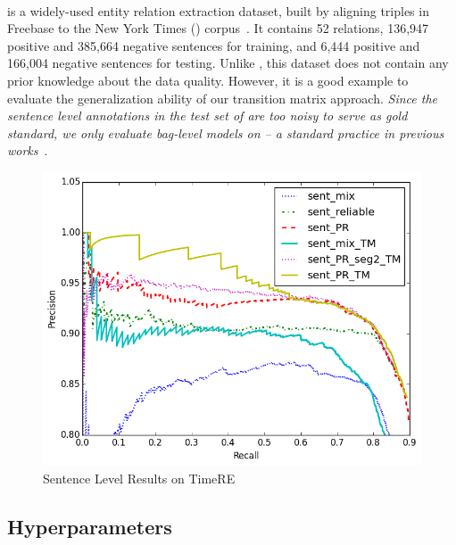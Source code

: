 \paragraph{\EntityRE} is a widely-used entity
relation extraction dataset, built %
by aligning triples
in Freebase to the New York Times (\NYT) corpus~\cite{riedel2010modeling}. It contains 52 relations, 136,947 positive and 385,664 negative sentences for training, and 6,444 positive and 166,004 negative sentences  for testing.
Unlike \TimeRE, this dataset does not contain any prior knowledge about the data quality.
However, it is a good example to evaluate the generalization ability of our transition matrix approach.
\emph{Since the sentence level annotations in the test set of \EntityRE are too noisy to serve as gold standard,  we only evaluate bag-level models on \EntityRE -- a standard practice in previous works}~\cite{surdeanu2012multi,zeng2015distant,lin2016neural}.


\begin{figure}[t!]
\begin{center}
\includegraphics[width=0.9\linewidth]{figures/sent_time_exp_overall.png}
\caption{Sentence Level Results on TimeRE}
\label{fig: sent_luo}
\end{center}
\end{figure}


\subsection{Hyperparameters}

